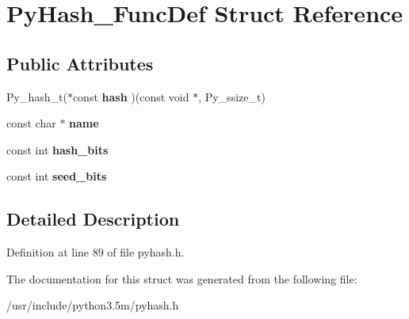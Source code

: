\hypertarget{structPyHash__FuncDef}{}\section{Py\+Hash\+\_\+\+Func\+Def Struct Reference}
\label{structPyHash__FuncDef}
\subsection*{Public Attributes}
\begin{DoxyCompactItemize}
\item 
Py\+\_\+hash\+\_\+t($\ast$const {\bfseries hash} )(const void $\ast$, Py\+\_\+ssize\+\_\+t)\hypertarget{structPyHash__FuncDef_a6e3b1f3220108d5a4b7aef06ed7c7f28}{}\label{structPyHash__FuncDef_a6e3b1f3220108d5a4b7aef06ed7c7f28}

\item 
const char $\ast$ {\bfseries name}\hypertarget{structPyHash__FuncDef_a126d0a62682dcba00096e3ee203b0a03}{}\label{structPyHash__FuncDef_a126d0a62682dcba00096e3ee203b0a03}

\item 
const int {\bfseries hash\+\_\+bits}\hypertarget{structPyHash__FuncDef_a0f1791318f7bc1264b18631e34d8a98b}{}\label{structPyHash__FuncDef_a0f1791318f7bc1264b18631e34d8a98b}

\item 
const int {\bfseries seed\+\_\+bits}\hypertarget{structPyHash__FuncDef_af2367b281dd0b81c9022586561504061}{}\label{structPyHash__FuncDef_af2367b281dd0b81c9022586561504061}

\end{DoxyCompactItemize}


\subsection{Detailed Description}


Definition at line 89 of file pyhash.\+h.



The documentation for this struct was generated from the following file\+:\begin{DoxyCompactItemize}
\item 
/usr/include/python3.\+5m/pyhash.\+h\end{DoxyCompactItemize}
